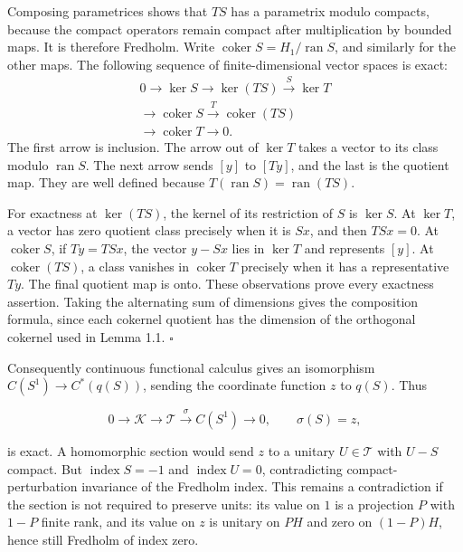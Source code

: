 \documentclass[
  11pt,
]{article}
\begin{document}
Composing parametrices shows that \(TS\) has a parametrix modulo
compacts, because the compact operators remain compact after
multiplication by bounded maps. It is therefore Fredholm. Write
\(\operatorname{coker}S=H_1/\operatorname{ran}S\), and similarly for the
other maps. The following sequence of finite-dimensional vector spaces
is exact: \[
\begin{gathered}
0\longrightarrow\ker S\longrightarrow\ker(TS)
\overset{S}{\longrightarrow}\ker T\\
\longrightarrow\operatorname{coker}S
\overset{T}{\longrightarrow}\operatorname{coker}(TS)\\
\longrightarrow\operatorname{coker}T\longrightarrow0.
\end{gathered}
\] The first arrow is inclusion. The arrow out of \(\ker T\) takes a
vector to its class modulo \(\operatorname{ran}S\). The next arrow sends
\([y]\) to \([Ty]\), and the last is the quotient map. They are well
defined because \(T(\operatorname{ran}S)=\operatorname{ran}(TS)\).

For exactness at \(\ker(TS)\), the kernel of its restriction of \(S\) is
\(\ker S\). At \(\ker T\), a vector has zero quotient class precisely
when it is \(Sx\), and then \(TSx=0\). At \(\operatorname{coker}S\), if
\(Ty=TSx\), the vector \(y-Sx\) lies in \(\ker T\) and represents
\([y]\). At \(\operatorname{coker}(TS)\), a class vanishes in
\(\operatorname{coker}T\) precisely when it has a representative \(Ty\).
The final quotient map is onto. These observations prove every exactness
assertion. Taking the alternating sum of dimensions gives the
composition formula, since each cokernel quotient has the dimension of
the orthogonal cokernel used in Lemma 1.1. \(\square\)

Consequently continuous functional calculus gives an isomorphism
\(C(S^1)\to C^*(q(S))\), sending the coordinate function \(z\) to
\(q(S)\). Thus

\[
0\longrightarrow\mathcal K\longrightarrow\mathcal T
\overset{\sigma}{\longrightarrow}C(S^1)\longrightarrow0,
\qquad \sigma(S)=z,
\]

is exact. A homomorphic section would send \(z\) to a unitary
\(U\in\mathcal T\) with \(U-S\) compact. But
\(\operatorname{index}S=-1\) and \(\operatorname{index}U=0\),
contradicting compact-perturbation invariance of the Fredholm index.
This remains a contradiction if the section is not required to preserve
units: its value on \(1\) is a projection \(P\) with \(1-P\) finite
rank, and its value on \(z\) is unitary on \(PH\) and zero on
\((1-P)H\), hence still Fredholm of index zero.
\end{document}
